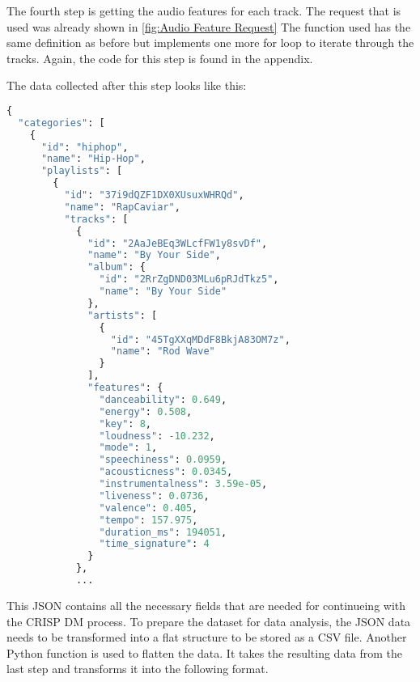 The fourth step is getting the audio features for each track.
The request that is used was already shown in \ref{fig:Audio Feature Request}
The function used has the same definition as before but implements one more for loop to iterate through
the tracks. Again, the code for this step is found in the appendix.

The data collected after this step looks like this:

\begin{lstlisting}[language=Python]
{
  "categories": [
    {
      "id": "hiphop",
      "name": "Hip-Hop",
      "playlists": [
        {
          "id": "37i9dQZF1DX0XUsuxWHRQd",
          "name": "RapCaviar",
          "tracks": [
            {
              "id": "2AaJeBEq3WLcfFW1y8svDf",
              "name": "By Your Side",
              "album": {
                "id": "2RrZgDND03MLu6pRJdTkz5",
                "name": "By Your Side"
              },
              "artists": [
                {
                  "id": "45TgXXqMDdF8BkjA83OM7z",
                  "name": "Rod Wave"
                }
              ],
              "features": {
                "danceability": 0.649,
                "energy": 0.508,
                "key": 8,
                "loudness": -10.232,
                "mode": 1,
                "speechiness": 0.0959,
                "acousticness": 0.0345,
                "instrumentalness": 3.59e-05,
                "liveness": 0.0736,
                "valence": 0.405,
                "tempo": 157.975,
                "duration_ms": 194051,
                "time_signature": 4
              }
            },
            ...
\end{lstlisting}

This JSON contains all the necessary fields that are needed for continueing with the CRISP DM process.
To prepare the dataset for data analysis, the JSON data needs to be transformed into a flat structure to
be stored as a CSV file.
Another Python function is used to flatten the data. It takes the resulting data from the last step and
transforms it into the following format.

